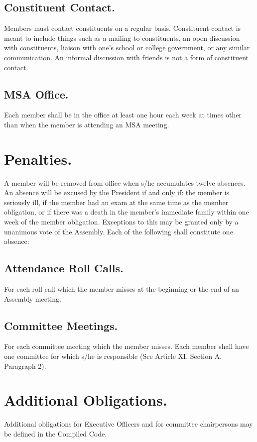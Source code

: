 \documentclass{rules}
\begin{document}
\subsection{Constituent Contact.}
Members must contact constituents on a regular basis. Constituent contact is meant to include things such as a mailing to constituents, an open discussion with constituents, liaison with one's school or college government, or any similar communication. An informal discussion with friends is not a form of constituent contact.
\subsection{MSA Office.}
Each member shall be in the office at least one hour each week at times other than when the member is attending an MSA meeting.

\section{Penalties.}
A member will be removed from office when s/he accumulates twelve absences. An absence will be excused by the President if and only if: the member is seriously ill, if the member had an exam at the same time as the member obligation, or if there was a death in the member's immediate family within one week of the member obligation. Exceptions to this may be granted only by a unanimous vote of the Assembly. Each of the following shall constitute one absence:
\subsection{Attendance Roll Calls.}
For each roll call which the member misses at the beginning or the end of an Assembly meeting.
\subsection{Committee Meetings.}
For each committee meeting which the member misses. Each member shall have one committee for which s/he is responsible (See Article XI, Section A, Paragraph 2).

\section{Additional Obligations.}
Additional obligations for Executive Officers and for committee chairpersons may be defined in the Compiled Code.

\end{document}
